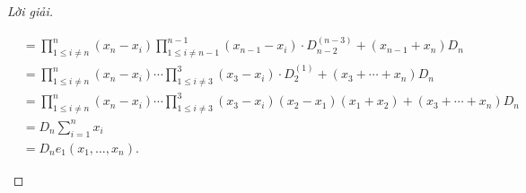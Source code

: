 \documentclass[class=linear-algebra,crop=false]{standalone}
\begin{document}
\begin{proof}[Lời giải]
\begin{enumerate}[label = (\alph*)]
\begin{align*}
			       & = \prod^{n}_{1\le i\ne n}(x_{n} - x_{i})\prod^{n-1}_{1\le i\ne n-1}(x_{n-1} - x_{i})\cdot D^{(n-3)}_{n-2} + (x_{n-1} + x_{n})D_{n}                                                                                              \\
			       & = \prod^{n}_{1\le i\ne n}(x_{n} - x_{i})\cdots \prod^{3}_{1\le i\ne 3}(x_{3} - x_{i})\cdot D^{(1)}_{2} + (x_{3} + \cdots + x_{n})D_{n}                                                                                          \\
			       & = \prod^{n}_{1\le i\ne n}(x_{n} - x_{i})\cdots \prod^{3}_{1\le i\ne 3}(x_{3} - x_{i})(x_{2} - x_{1})(x_{1} + x_{2}) + (x_{3} + \cdots + x_{n})D_{n}                                                                             \\
			       & = D_{n}\sum^{n}_{i=1}x_{i}                                                                                                                                                                                                      \\
			       & = D_{n}e_{1}(x_{1},\ldots, x_{n}).
		      \end{align*}


\end{enumerate}
\end{proof}
\end{document}
